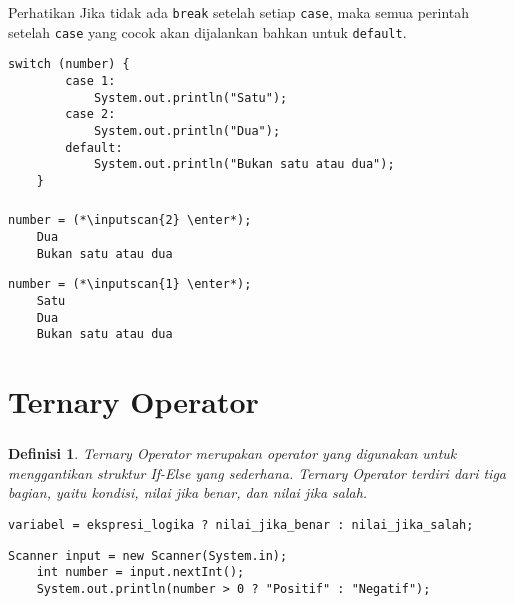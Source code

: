 \documentclass[aspectratio=169]{beamer}
\newtheorem*{definisi}{Definisi}
\theoremstyle{definition}
\newcommand{\enter}{\raisebox{-1.8pt}{\begin{tikzpicture}[scale=0.3]
    \draw[thin,fill=gray] (0,0) rectangle (2,1);
    \draw (0.3,0.3) -- (0.7,0.3)--(0.7,0.6);     
\end{tikzpicture}}}
\newcommand{\inputscan}[1]{\raisebox{0pt}[1pt]{\colorbox{darkgray}{#1}}}
\begin{document}
    \begin{frame}[fragile]
        \frametitle{\insertsection}
        \begin{alertblock}{Perhatikan}
            Jika tidak ada \texttt{break} setelah setiap \texttt{case}, maka semua perintah setelah \texttt{case} yang cocok akan dijalankan bahkan untuk \texttt{default}. 
        \end{alertblock}
        \begin{lstlisting}[firstnumber=9]
    switch (number) {
        case 1:
            System.out.println("Satu");
        case 2:
            System.out.println("Dua");
        default:
            System.out.println("Bukan satu atau dua");
    }
        \end{lstlisting}
    \end{frame}

    \begin{frame}[fragile]
        \frametitle{\insertsection}
        \begin{lstlisting}[style=output, caption={Contoh Output}]
    number = (*\inputscan{2} \enter*);
    Dua
    Bukan satu atau dua
        \end{lstlisting}
        \begin{lstlisting}[style=output]
    number = (*\inputscan{1} \enter*);
    Satu
    Dua
    Bukan satu atau dua
        \end{lstlisting}
    \end{frame}

    \section{Ternary Operator}
    \begin{frame}[fragile]
        \frametitle{\insertsection}
        \begin{definisi}
            Ternary Operator merupakan operator yang digunakan untuk menggantikan struktur If-Else yang sederhana. Ternary Operator terdiri dari tiga bagian, yaitu kondisi, nilai jika benar, dan nilai jika salah.
        \end{definisi}
        \begin{lstlisting}[numbers=none]
    variabel = ekspresi_logika ? nilai_jika_benar : nilai_jika_salah;
        \end{lstlisting}
        \begin{lstlisting}[caption={Contoh Ternary Operator}, firstnumber=34]
    Scanner input = new Scanner(System.in);
    int number = input.nextInt();
    System.out.println(number > 0 ? "Positif" : "Negatif");
        \end{lstlisting}
    \end{frame}
\end{document}
